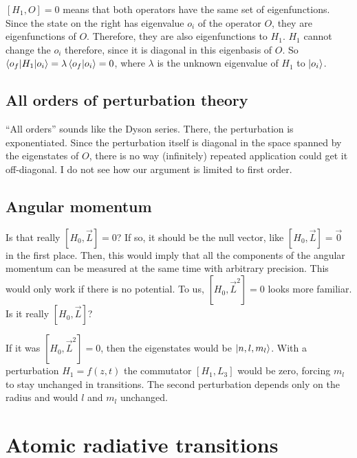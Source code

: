 \documentclass[11pt, english, fleqn, DIV=15, headinclude, BCOR=1.5cm]{scrartcl}
\begin{document}
$[H_1, O] = 0$ means that both operators have the same set of eigenfunctions.
Since the state on the right has eigenvalue $o_i$ of the operator $O$, they are
eigenfunctions of $O$. Therefore, they are also eigenfunctions to $H_1$. $H_1$
cannot change the $o_i$ therefore, since it is diagonal in this eigenbasis of
$O$. So $\braket{o_f | H_1 | o_i} = \lambda \braket{o_f | o_i} = 0$, where
$\lambda$ is the unknown eigenvalue of $H_1$ to $\ket{o_i}$.

\subsection{All orders of perturbation theory}

“All orders” sounds like the Dyson series. There, the perturbation is
exponentiated. Since the perturbation itself is diagonal in the space spanned
by the eigenstates of $O$, there is no way (infinitely) repeated application
could get it off-diagonal. I do not see how our argument is limited to first
order.

\subsection{Angular momentum}

\begin{question}
    Is that really $[H_0, \vec L] = 0$? If so, it should be the null vector,
    like $[H_0, \vec L] = \vec 0$ in the first place. Then, this would imply
    that all the components of the angular momentum can be measured at the same
    time with arbitrary precision. This would only work if there is no
    potential. To us, $[H_0, \vec L^2] = 0$ looks more familiar. Is it really
    $[H_0, \vec L]$?
\end{question}

If it was $[H_0, \vec L^2] = 0$, then the eigenstates would be $\ket{n, l,
m_l}$. With a perturbation $H_1 = f(z, t)$ the commutator $[H_1, L_3]$ would be
zero, forcing $m_l$ to stay unchanged in transitions. The second perturbation
depends only on the radius and would $l$ and $m_l$ unchanged.

\section{Atomic radiative transitions}
\end{document}
